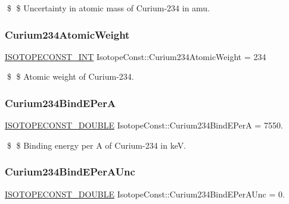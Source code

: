 \$ \$ Uncertainty in atomic mass of Curium-\/234 in amu. \mbox{\label{group___isotope_const-_curium-_cm234_ga376c345710eea63df224b5b62e7133e8}} 
\subsubsection{\texorpdfstring{Curium234\+Atomic\+Weight}{Curium234AtomicWeight}}
{\footnotesize\ttfamily \mbox{\hyperlink{group___isotope_const-_macros_ga5f18360b3e99483a35c32d789e62621c}{I\+S\+O\+T\+O\+P\+E\+C\+O\+N\+S\+T\+\_\+\+I\+NT}} Isotope\+Const\+::\+Curium234\+Atomic\+Weight = 234}

\$ \$ Atomic weight of Curium-\/234. \mbox{\label{group___isotope_const-_curium-_cm234_gab0e4e6f4299f6dc5b3428e585b718517}} 
\subsubsection{\texorpdfstring{Curium234\+Bind\+E\+PerA}{Curium234BindEPerA}}
{\footnotesize\ttfamily \mbox{\hyperlink{group___isotope_const-_macros_ga8f45a7272ce02c0b4c65c44636ed719a}{I\+S\+O\+T\+O\+P\+E\+C\+O\+N\+S\+T\+\_\+\+D\+O\+U\+B\+LE}} Isotope\+Const\+::\+Curium234\+Bind\+E\+PerA = 7550.}

\$ \$ Binding energy per A of Curium-\/234 in keV. \mbox{\label{group___isotope_const-_curium-_cm234_ga3890dbc72e5abf6a3fa92c573a0c6b29}} 
\subsubsection{\texorpdfstring{Curium234\+Bind\+E\+Per\+A\+Unc}{Curium234BindEPerAUnc}}
{\footnotesize\ttfamily \mbox{\hyperlink{group___isotope_const-_macros_ga8f45a7272ce02c0b4c65c44636ed719a}{I\+S\+O\+T\+O\+P\+E\+C\+O\+N\+S\+T\+\_\+\+D\+O\+U\+B\+LE}} Isotope\+Const\+::\+Curium234\+Bind\+E\+Per\+A\+Unc = 0.}

